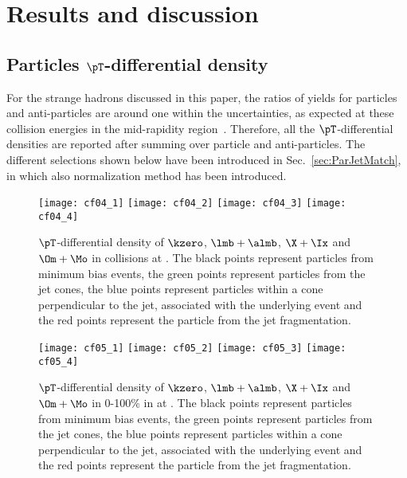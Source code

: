 \documentclass[ALICE,manyauthors]{cernphprep}
\begin{document}
\section{Results and discussion}%
\label{sec:Results}

\subsection{Particles $\pT$-differential density}
\label{subsec:ParPtDensity}

For the strange hadrons discussed in this paper, the ratios of yields for particles and anti-particles are around one within the uncertainties, as expected at these collision energies in the mid-rapidity region~\cite{Acharya:2020uxl, ALICE:2015mpp}.
Therefore, all the $\pT$-differential densities are reported after summing over particle and anti-particles.
The different selections shown below have been introduced in Sec.~\ref{sec:ParJetMatch}, in which also normalization method has been introduced.

\begin{figure}[!ht]
	\begin{center}
		\texttt{[image: cf04\_1]}
		\texttt{[image: cf04\_2]}
		\texttt{[image: cf04\_3]}
		\texttt{[image: cf04\_4]}
	\end{center}
	\caption{$\pT$-differential density of $\kzero$, $\lmb + \almb$, $\X + \Ix$ and $\Om + \Mo$ in \pp collisions at \thirteen. The black points represent particles from minimum bias events, the green points represent particles from the jet cones, the blue points represent particles within a cone perpendicular to the jet, associated with the underlying event and the red points represent the particle from the jet fragmentation.}
	\label{fig:ppSpect}
\end{figure}
\begin{figure}[!ht]
	\begin{center}
		\texttt{[image: cf05\_1]}
		\texttt{[image: cf05\_2]}
		\texttt{[image: cf05\_3]}
		\texttt{[image: cf05\_4]}
	\end{center}
	\caption{$\pT$-differential density of $\kzero$, $\lmb + \almb$, $\X + \Ix$ and $\Om + \Mo$ in 0-100\% in \pPb at \fivenn. The black points represent particles from minimum bias events, the green points represent particles from the jet cones, the blue points represent particles within a cone perpendicular to the jet, associated with the underlying event and the red points represent the particle from the jet fragmentation.}
	\label{fig:pPbSpect}
\end{figure}
\end{document}
